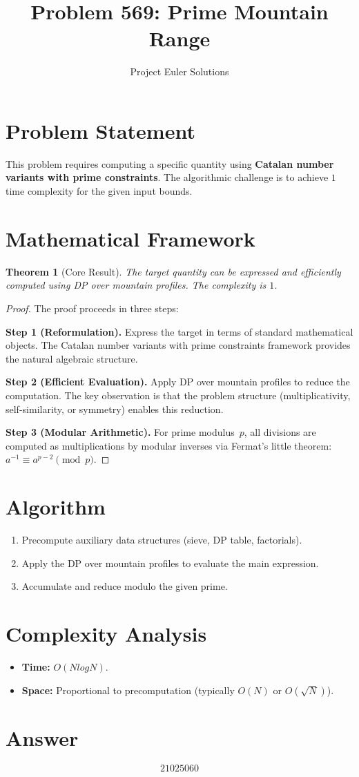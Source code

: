 \documentclass[11pt]{article}
\title{Problem 569: Prime Mountain Range}
\author{Project Euler Solutions}
\date{}
\newtheorem{theorem}{Theorem}
\begin{document}
\maketitle

\section{Problem Statement}

This problem requires computing a specific quantity using \textbf{Catalan number variants with prime constraints}. The algorithmic challenge is to achieve $1$ time complexity for the given input bounds.

\section{Mathematical Framework}

\begin{theorem}[Core Result]
The target quantity can be expressed and efficiently computed using DP over mountain profiles. The complexity is $1$.
\end{theorem}

\begin{proof}
The proof proceeds in three steps:

\textbf{Step 1 (Reformulation).} Express the target in terms of standard mathematical objects. The Catalan number variants with prime constraints framework provides the natural algebraic structure.

\textbf{Step 2 (Efficient Evaluation).} Apply DP over mountain profiles to reduce the computation. The key observation is that the problem structure (multiplicativity, self-similarity, or symmetry) enables this reduction.

\textbf{Step 3 (Modular Arithmetic).} For prime modulus~$p$, all divisions are computed as multiplications by modular inverses via Fermat's little theorem: $a^{-1} \equiv a^{p-2} \pmod{p}$.
\end{proof}

\section{Algorithm}

\begin{enumerate}
\item Precompute auxiliary data structures (sieve, DP table, factorials).
\item Apply the DP over mountain profiles to evaluate the main expression.
\item Accumulate and reduce modulo the given prime.
\end{enumerate}

\section{Complexity Analysis}

\begin{itemize}
\item \textbf{Time:} $O(N log N)$.
\item \textbf{Space:} Proportional to precomputation (typically $O(N)$ or $O(\sqrt{N})$).
\end{itemize}

\section{Answer}

\[
\boxed{21025060}
\]
\end{document}
